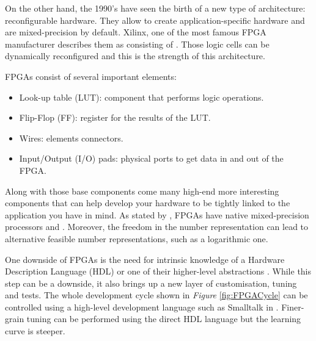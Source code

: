 On the other hand, the 1990's have seen the birth of a new type of architecture: reconfigurable hardware. They allow to create application-specific hardware and are mixed-precision by default. Xilinx, one of the most famous FPGA manufacturer describes them as consisting of  \cite{Xilinx2017}. Those logic cells can be dynamically reconfigured and this is the strength of this architecture.

FPGAs consist of several important elements:
\begin{itemize}
  \item Look-up table (LUT): component that performs logic operations.
  \item Flip-Flop (FF): register  for the results of the LUT.
  \item Wires: elements connectors.
  \item Input/Output (I/O) pads: physical ports to get data in and out of the FPGA.
\end{itemize}

Along with those base components come many high-end more interesting components that can help develop your hardware to be tightly linked to the application you have in mind. As stated by \cite{Goddeke2007}, FPGAs have native mixed-precision processors and . Moreover, the freedom in the number representation can lead to alternative feasible number representations, such as a logarithmic one.

One downside of FPGAs is the need for intrinsic knowledge of a Hardware Description Language (HDL) or one of their higher-level abstractions \cite{XuanSang2014}. While this step can be a downside, it also brings up a new layer of customisation, tuning and tests. The whole development cycle shown in \emph{Figure} \ref{fig:FPGACycle} can be controlled using a high-level development language such as Smalltalk in \cite{XuanSang2014}. Finer-grain tuning can be performed using the direct HDL language but the learning curve is steeper.

